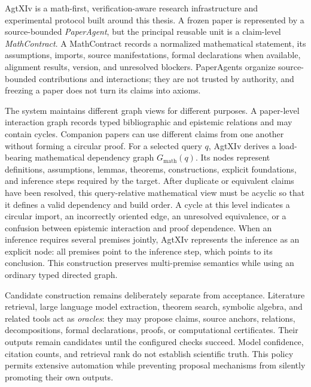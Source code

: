 AgtXIv is a math-first, verification-aware research infrastructure and experimental protocol built around this thesis. A frozen paper is represented by a source-bounded \emph{PaperAgent}, but the principal reusable unit is a claim-level \emph{MathContract}. A MathContract records a normalized mathematical statement, its assumptions, imports, source manifestations, formal declarations when available, alignment results, version, and unresolved blockers. PaperAgents organize source-bounded contributions and interactions; they are not trusted by authority, and freezing a paper does not turn its claims into axioms.

The system maintains different graph views for different purposes. A paper-level interaction graph records typed bibliographic and epistemic relations and may contain cycles. Companion papers can use different claims from one another without forming a circular proof. For a selected query $q$, AgtXIv derives a load-bearing mathematical dependency graph $G_{\mathrm{math}}(q)$. Its nodes represent definitions, assumptions, lemmas, theorems, constructions, explicit foundations, and inference steps required by the target. After duplicate or equivalent claims have been resolved, this query-relative mathematical view must be acyclic so that it defines a valid dependency and build order. A cycle at this level indicates a circular import, an incorrectly oriented edge, an unresolved equivalence, or a confusion between epistemic interaction and proof dependence. When an inference requires several premises jointly, AgtXIv represents the inference as an explicit node: all premises point to the inference step, which points to its conclusion. This construction preserves multi-premise semantics while using an ordinary typed directed graph.

Candidate construction remains deliberately separate from acceptance. Literature retrieval, large language model extraction, theorem search, symbolic algebra, and related tools act as \emph{oracles}: they may propose claims, source anchors, relations, decompositions, formal declarations, proofs, or computational certificates. Their outputs remain candidates until the configured checks succeed. Model confidence, citation counts, and retrieval rank do not establish scientific truth. This policy permits extensive automation while preventing proposal mechanisms from silently promoting their own outputs.

